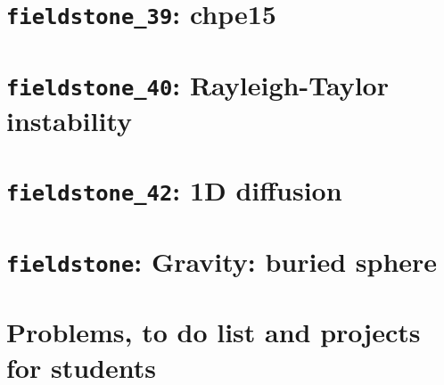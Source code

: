 \documentclass[a4paper]{article}
\begin{document}
\newpage %
\section{{\tt fieldstone\_39}: chpe15 \label{f39}} %

\newpage %
\section{{\tt fieldstone\_40}: Rayleigh-Taylor instability \label{f40}} %


\newpage %
\section{{\tt fieldstone\_42}: 1D diffusion \label{f42}} %


\newpage %
\section{{\tt fieldstone}: Gravity: buried sphere} %

\newpage %
\section{Problems, to do list and projects for students} %

\appendix %

\newpage %
\end{document}
